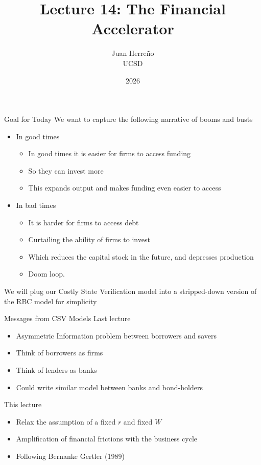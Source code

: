 \documentclass[11pt,aspectratio=169,xcolor={dvipsnames},hyperref={pdftex,pdfpagemode=UseNone,hidelinks,pdfdisplaydoctitle=true},usepdftitle=false]{beamer}
\title{Lecture 14: The Financial Accelerator}
\author{Juan Herre\~{n}o\\UCSD}
\date{2026}
\begin{document}
\maketitle


\begin{frame}{Goal for Today}
 We want to capture the following narrative of booms and busts
\begin{itemize}
\item In good times
\begin{itemize}
\item In good times it is easier for firms to access funding
\item So they can invest more
\item This expands output and makes funding even easier to access
\end{itemize}
\item In bad times
\begin{itemize}
\item It is harder for firms to access debt
\item Curtailing the ability of firms to invest
\item Which reduces the capital stock in the future, and depresses production
\item Doom loop.	
\end{itemize}
\end{itemize}
We will plug our Costly State Verification model into a stripped-down version of the RBC model for simplicity
\end{frame}

\begin{frame}{Messages from CSV Models}
Last lecture
\begin{itemize}
\item Asymmetric Information problem between borrowers and savers
\item Think of borrowers as firms
\item Think of lenders as banks
\item Could write similar model between banks and bond-holders
\end{itemize}
This lecture
\begin{itemize}
\item Relax the assumption of a fixed $r$ and fixed $W$
\item Amplification of financial frictions with the business cycle
\item Following Bernanke Gertler (1989)
\end{itemize}
\end{frame}
\end{document}
